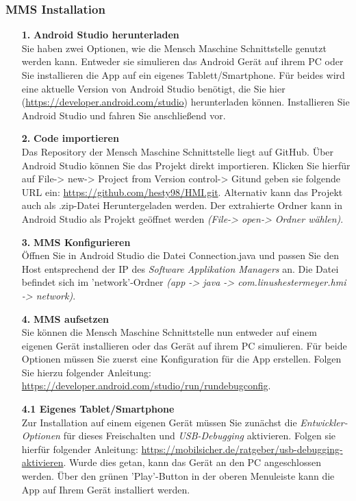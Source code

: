 \subsubsection{MMS Installation}
\begin{itemize}
	\item[\textbf{1.}] \textbf{Android Studio herunterladen}\\
	Sie haben zwei Optionen, wie die Mensch Maschine Schnittstelle genutzt werden kann. Entweder sie simulieren das Android Gerät auf ihrem PC oder Sie installieren die App auf ein eigenes Tablett/Smartphone. Für beides wird eine aktuelle Version von Android Studio benötigt, die Sie hier (\url{https://developer.android.com/studio}) herunterladen können. Installieren Sie Android Studio und fahren Sie anschließend vor.

	\item[\textbf{2.}] \textbf{Code importieren}\\
	Das Repository der Mensch Maschine Schnittstelle liegt auf GitHub. Über Android Studio können Sie das Projekt direkt importieren. Klicken Sie hierfür auf \glqq File\grqq -> \glqq new\grqq -> \glqq Project from Version control\grqq -> \glqq Git\grqq und geben sie folgende URL ein: \url{https://github.com/hesty98/HMI.git}.	Alternativ kann das Projekt auch als .zip-Datei Heruntergeladen werden. Der extrahierte Ordner kann in Android Studio als Projekt geöffnet werden \textit{(\glqq File\grqq -> \glqq open\grqq -> \glqq Ordner wählen\grqq)}.
	
	\item[\textbf{3.}] \textbf{MMS Konfigurieren}\\
	Öffnen Sie in Android Studio die Datei Connection.java und passen Sie den Host entsprechend der IP des \textit{Software Applikation Managers} an. Die Datei befindet sich im 'network'-Ordner \textit{(app -> java -> com.linushestermeyer.hmi -> network)}.
	
	\item[\textbf{4.}] \textbf{MMS aufsetzen}\\
	Sie können die Mensch Maschine Schnittstelle nun entweder auf einem eigenen Gerät installieren oder das Gerät auf ihrem PC simulieren. Für beide Optionen müssen Sie zuerst eine Konfiguration für die App erstellen.  Folgen Sie hierzu folgender Anleitung: \url{https://developer.android.com/studio/run/rundebugconfig}.
	
		\subitem \textbf{4.1 Eigenes Tablet/Smartphone}\\
			Zur Installation auf einem eigenen Gerät müssen Sie zunächst die \textit{Entwickler-Optionen} für dieses Freischalten und \textit{USB-Debugging} aktivieren. Folgen sie hierfür folgender Anleitung: \url{https://mobilsicher.de/ratgeber/usb-debugging-aktivieren}. Wurde dies getan, kann das Gerät an den PC angeschlossen werden. Über den grünen 'Play'-Button in der oberen Menuleiste kann die App auf Ihrem Gerät installiert werden.
			

\end{itemize}
